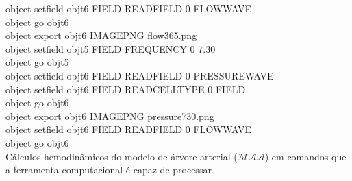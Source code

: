 \begin{appendices}
\begin{algorithm}[H]
		object set\underline{\space\space}field obj\underline{\space\space}t6 FIELD READ\underline{\space\space}FIELD 0 FLOW\underline{\space\space}WAVE \\
		object go obj\underline{\space\space}t6 \\
		object export obj\underline{\space\space}t6 IMAGE\underline{\space\space}PNG flow\underline{\space\space}3\underline{\space\space}65.png \\
		object set\underline{\space\space}field obj\underline{\space\space}t5 FIELD FREQUENCY 0 7.30 \\
		object go obj\underline{\space\space}t5 \\
		object set\underline{\space\space}field obj\underline{\space\space}t6 FIELD READ\underline{\space\space}FIELD 0 PRESSURE\underline{\space\space}WAVE \\
		object set\underline{\space\space}field obj\underline{\space\space}t6 FIELD READ\underline{\space\space}CELL\underline{\space\space}TYPE 0 FIELD \\
		object go obj\underline{\space\space}t6 \\
		object export obj\underline{\space\space}t6 IMAGE\underline{\space\space}PNG pressure\underline{\space\space}7\underline{\space\space}30.png \\
		object set\underline{\space\space}field obj\underline{\space\space}t6 FIELD READ\underline{\space\space}FIELD 0 FLOW\underline{\space\space}WAVE \\
		object go obj\underline{\space\space}t6 \\
		
		\caption{Cálculos hemodinâmicos do modelo de árvore arterial ($\mathcal{MAA}$) em comandos que a ferramenta computacional é capaz de processar.}
	\end{algorithm}
	

\end{appendices}
